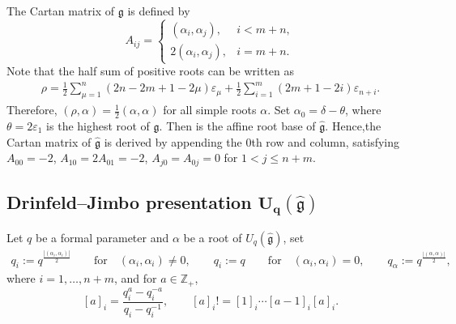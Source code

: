 \documentclass[10pt,a4paper]{amsart}
\numberwithin{equation}{section}
\begin{document}
The Cartan matrix  of $\mathfrak{g}$ is defined by
\begin{equation*}
 A_{ij}=
 \begin{cases}
 (\alpha_i, \alpha_j), &i<m+n,\\
 2(\alpha_i, \alpha_j), &i=m+n.
 \end{cases}
\end{equation*}
Note that
the half sum of positive roots can be written as
\begin{align*}
 \rho=\frac{1}{2}\sum\limits_{\mu=1}^{n}(2n-2m+1-2\mu)\varepsilon_\mu+\frac{1}{2}\sum\limits_{i=1}^{m}(2m+1-2i)\varepsilon_{n+i}.
\end{align*}
Therefore, $(\rho,\alpha)=\frac{1}{2}(\alpha,\alpha)$ for all simple roots $\alpha$.
Set $\alpha_0=\delta-\theta$, where $\theta=2\varepsilon_1$ is the highest root of $\mathfrak{g}$. Then
 is the affine root base of $\mathfrak{\hat{g}}$. Hence,the Cartan matrix  of $\mathfrak{\hat{g}}$ is derived by appending the 0th row and column, satisfying $A_{00}=-2$, $ A_{10}=2A_{01}=-2$, $ A_{j0}=A_{0j}=0$ for $1<j\leqslant n+m$.


\subsection[Drinfeld--Jimbo presentation U\_q(g)]{Drinfeld--Jimbo presentation $\boldsymbol{U_q(\mathfrak{\hat{g}})}$}

Let $q$ be a formal parameter and $\alpha$ be a root of $U_q(\mathfrak{\hat{g}})$, set
\begin{gather*}
 q_i := q^{\frac{|(\alpha_i, \alpha_i)|}{2}}\qquad \textrm{for}\quad(\alpha_i, \alpha_i)\neq0, \qquad q_i := q\qquad\textrm{for}\quad(\alpha_i, \alpha_i)=0,\qquad
 q_\alpha := q^{\frac{|(\alpha, \alpha)|}{2}},
\end{gather*}
where $i=1,\dots,n+m$, and for $ a \in \mathbb{Z}_+$,
\[
 [a]_i = \frac{q_i^a - q_i^{-a}}{q_i - q_i^{-1}}, \qquad [a]_i! = [1]_i \cdots [a-1]_i [a]_i.
 \]
\end{document}
